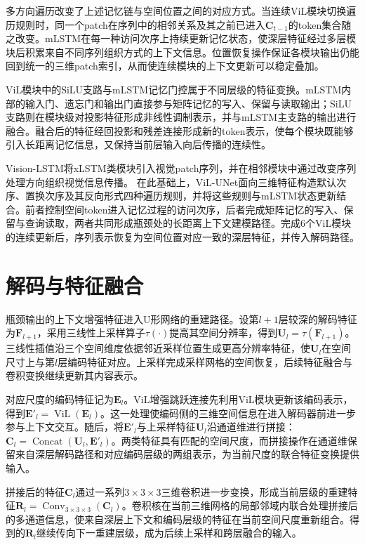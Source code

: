 多方向遍历改变了上述记忆链与空间位置之间的对应方式。当连续ViL模块切换遍历规则时，同一个patch在序列中的相邻关系及其之前已进入\(\mathbf C_{t-1}\)的token集合随之改变。mLSTM在每一种访问次序上持续更新记忆状态，使深层特征经过多层模块后积累来自不同序列组织方式的上下文信息。位置恢复操作保证各模块输出仍能回到统一的三维patch索引，从而使连续模块的上下文更新可以稳定叠加。

ViL模块中的SiLU支路与mLSTM记忆门控属于不同层级的特征变换。mLSTM内部的输入门、遗忘门和输出门直接参与矩阵记忆的写入、保留与读取输出；SiLU支路则在模块级对投影特征形成非线性调制表示，并与mLSTM主支路的输出进行融合。融合后的特征经回投影和残差连接形成新的token表示，使每个模块既能够引入长距离记忆信息，又保持当前层输入向后传播的连续性。

Vision-LSTM将xLSTM类模块引入视觉patch序列，并在相邻模块中通过改变序列处理方向组织视觉信息传播。\cite{alkin2025visionlstm} 在此基础上，ViL-UNet面向三维特征构造默认次序、置换次序及其反向形式四种遍历规则，并将这些规则与mLSTM状态更新结合。前者控制空间token进入记忆过程的访问次序，后者完成矩阵记忆的写入、保留与查询读取，两者共同形成瓶颈处的长距离上下文建模路径。完成6个ViL模块的连续更新后，序列表示恢复为空间位置对应一致的深层特征，并传入解码路径。

\section{解码与特征融合}

瓶颈输出的上下文增强特征进入U形网络的重建路径。设第\(l+1\)层较深的解码特征为\(\mathbf F_{l+1}\)，采用三线性上采样算子\(\tau(\cdot)\)提高其空间分辨率，得到\(\mathbf U_l=\tau(\mathbf F_{l+1})\)。三线性插值沿三个空间维度依据邻近采样位置生成更高分辨率特征，使\(\mathbf U_l\)在空间尺寸上与第\(l\)层编码特征对应。上采样完成采样网格的空间恢复，后续特征融合与卷积变换继续更新其内容表示。

对应尺度的编码特征记为\(\mathbf E_l\)。ViL增强跳跃连接先利用ViL模块更新该编码表示，得到\(\mathbf E'_l=\operatorname{ViL}(\mathbf E_l)\)。这一处理使编码侧的三维空间信息在进入解码器前进一步参与上下文交互。随后，将\(\mathbf E'_l\)与上采样特征\(\mathbf U_l\)沿通道维进行拼接：\(\mathbf C_l=\operatorname{Concat}(\mathbf U_l,\mathbf E'_l)\)。两类特征具有匹配的空间尺度，而拼接操作在通道维保留来自深层解码路径和对应编码层级的两组表示，为当前尺度的联合特征变换提供输入。


拼接后的特征\(\mathbf C_l\)通过一系列\(3\times3\times3\)三维卷积进一步变换，形成当前层级的重建特征\(\mathbf R_l=\operatorname{Conv}_{3\times3\times3}(\mathbf C_l)\)。卷积核在当前三维网格的局部邻域内联合处理拼接后的多通道信息，使来自深层上下文和编码层级的特征在当前空间尺度重新组合。得到的\(\mathbf R_l\)继续传向下一重建层级，成为后续上采样和跨层融合的输入。

